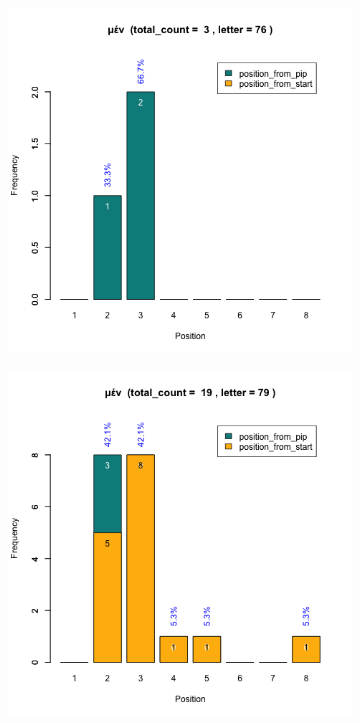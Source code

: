 \documentclass[a4paper]{article}
\begin{document}
\begin{figure}
\begin{subfigure}{0.45\textwidth}
\centering
\includegraphics[width=1\linewidth]{../../data/output/paul_R_par/plots/par5_lt76.png}
\end{subfigure}
\begin{subfigure}{0.45\textwidth}
\centering
\includegraphics[width=1\linewidth]{../../data/output/paul_R_par/plots/par5_lt79.png}
\end{subfigure}
\end{figure}
\end{document}

